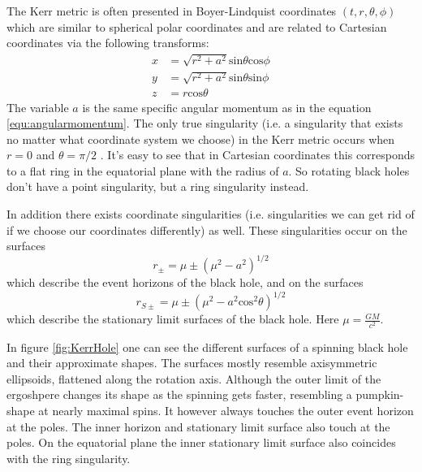 \documentclass[english, oneside]{HYgradu}
\begin{document}

The Kerr metric is often presented in Boyer-Lindquist coordinates $(t, r, \theta, \phi)$ which are similar to spherical polar coordinates and are related to Cartesian coordinates via the following transforms:
\begin{align*}
x &= \sqrt{r^2 + a^2} \mathrm{sin}\theta \mathrm{cos}\phi \\
y &= \sqrt{r^2 + a^2} \mathrm{sin}\theta \mathrm{sin}\phi \\
z &= r \mathrm{cos}\theta
\end{align*}
The variable $a$ is the same specific angular momentum as in the equation \ref{equ:angularmomentum}. The only true singularity (i.e. a singularity that exists no matter what coordinate system we choose) in the Kerr metric occurs when $r=0$ and $\theta = \pi/2$ \citep{grintro}. It's easy to see that in Cartesian coordinates this corresponds to a flat ring in the equatorial plane with the radius of $a$. So rotating black holes don't have a point singularity, but a ring singularity instead.

In addition there exists coordinate singularities (i.e. singularities we can get rid of if we choose our coordinates differently) as well. These singularities occur on the surfaces
\begin{equation} \label{equ:evenhorizons}
r_\pm = \mu \pm (\mu^2 - a^2)^{1/2}
\end{equation}
which describe the event horizons of the black hole, and on the surfaces
\begin{equation} \label{equ:statlimsurf}
r_{S \pm} = \mu \pm (\mu^2 - a^2 \mathrm{cos}^2 \theta)^{1/2}
\end{equation}
which describe the stationary limit surfaces of the black hole. Here $\mu = \frac{GM}{c^2}$. 

In figure \ref{fig:KerrHole} one can see the different surfaces of a spinning black hole and their approximate shapes. The surfaces mostly resemble axisymmetric ellipsoids, flattened along the rotation axis. Although the outer limit of the ergoshpere changes its shape as the spinning gets faster, resembling a pumpkin-shape at nearly maximal spins. It however always touches the outer event horizon at the poles. The inner horizon and stationary limit surface also touch at the poles. On the equatorial plane the inner stationary limit surface also coincides with the ring singularity.
\end{document}
